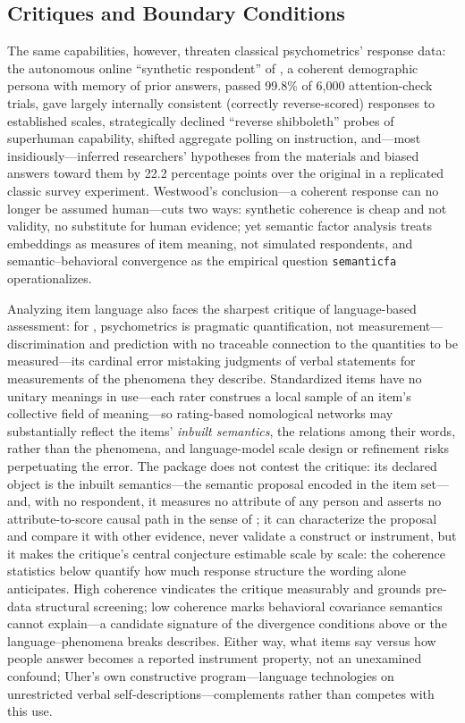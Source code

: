 \subsection{Critiques and Boundary Conditions}

The same capabilities, however, threaten classical psychometrics' response data: the autonomous online ``synthetic respondent'' of \citet{westwood-2025}, a coherent demographic persona with memory of prior answers, passed 99.8\% of 6{,}000 attention-check trials, gave largely internally consistent (correctly reverse-scored) responses to established scales, strategically declined ``reverse shibboleth'' probes of superhuman capability, shifted aggregate polling on instruction, and---most insidiously---inferred researchers' hypotheses from the materials and biased answers toward them by 22.2 percentage points over the original in a replicated classic survey experiment. Westwood's conclusion---a coherent response can no longer be assumed human---cuts two ways: synthetic coherence is cheap and not validity, no substitute for human evidence; yet semantic factor analysis treats embeddings as measures of item meaning, not simulated respondents, and semantic--behavioral convergence as the empirical question \texttt{semanticfa} operationalizes.

Analyzing item language also faces the sharpest critique of language-based assessment: for \citet{uher-2025}, psychometrics is pragmatic quantification, not measurement---discrimination and prediction with no traceable connection to the quantities to be measured---its cardinal error mistaking judgments of verbal statements for measurements of the phenomena they describe. Standardized items have no unitary meanings in use---each rater construes a local sample of an item's collective field of meaning---so rating-based nomological networks may substantially reflect the items' \emph{inbuilt semantics}, the relations among their words, rather than the phenomena, and language-model scale design or refinement risks perpetuating the error. The package does not contest the critique: its declared object is the inbuilt semantics---the semantic proposal encoded in the item set---and, with no respondent, it measures no attribute of any person and asserts no attribute-to-score causal path in the sense of \citet{borsboom-etal-2004}; it can characterize the proposal and compare it with other evidence, never validate a construct or instrument, but it makes the critique's central conjecture estimable scale by scale: the coherence statistics below quantify how much response structure the wording alone anticipates. High coherence vindicates the critique measurably and grounds pre-data structural screening; low coherence marks behavioral covariance semantics cannot explain---a candidate signature of the divergence conditions above or the language--phenomena breaks \citet{uher-2025} describes. Either way, what items say versus how people answer becomes a reported instrument property, not an unexamined confound; Uher's own constructive program---language technologies on unrestricted verbal self-descriptions---complements rather than competes with this use.
